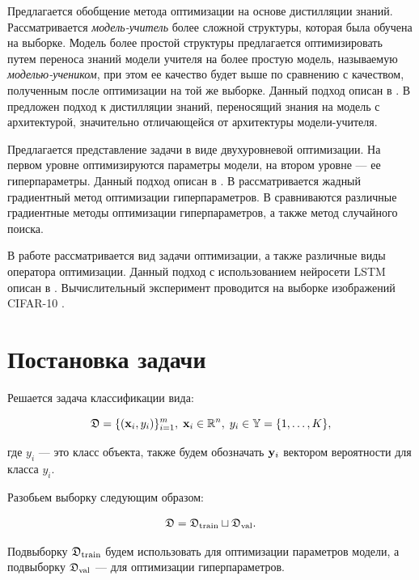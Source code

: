 \documentclass[12pt, twoside]{article}
\begin{document}
Предлагается обобщение метода оптимизации на основе дистилляции знаний. Рассматривается \textit{модель-учитель} более сложной структуры, которая была обучена на выборке. Модель более простой структуры предлагается оптимизировать путем переноса знаний модели учителя на более простую модель, называемую \textit{моделью-учеником}, при этом ее качество будет выше по сравнению с качеством, полученным после оптимизации на той же выборке. Данный подход описан в \cite{journals/corr/HintonVD15}. В \cite{conf/cvpr/PassalisTT20} предложен подход к дистилляции знаний, переносящий знания на модель с архитектурой, значительно отличающейся от архитектуры модели-учителя.

Предлагается представление задачи в виде двухуровневой оптимизации. На первом уровне оптимизируются параметры модели, на втором уровне --- ее гиперпараметры. Данный подход описан в \cite{journals/corr/LuketinaBR15, journals/anor/BakhteevS20, journals/corr/MaclaurinDA15}. В \cite{journals/corr/LuketinaBR15} рассматривается жадный градиентный метод оптимизации гиперпараметров. В \cite{journals/anor/BakhteevS20} сравниваются различные градиентные методы оптимизации гиперпараметров, а также метод случайного поиска.

В работе рассматривается вид задачи оптимизации, а также различные виды оператора оптимизации. Данный подход с использованием нейросети LSTM описан в \cite{journals/corr/AndrychowiczDGH16}. Вычислительный эксперимент проводится на выборке изображений CIFAR-10 \cite{krizhevsky2009learning}.

\section{Постановка задачи}
Решается задача классификации вида:

\begin{equation} \label{eq:data}
    \fD = \{(\bx_i, y_i)\}_{i=1}^{m},\; \bx_i \in \bbR^n,\; y_i \in \bbY = \{1, \dots, K\},
\end{equation}

\noindent
где $y_i$ — это класс объекта, также будем обозначать $\mathbf{y}_i$ вектором вероятности для
класса $y_i$.

Разобьем выборку следующим образом:

\begin{equation} \label{eq:split}
    \fD = \fD_\text{train} \sqcup \fD_\text{val}.
\end{equation}

Подвыборку $\mathfrak{D}_\text{train}$ будем использовать для оптимизации параметров модели, а подвыборку $\mathfrak{D}_\text{val}$ --- для оптимизации гиперпараметров.
\end{document}
